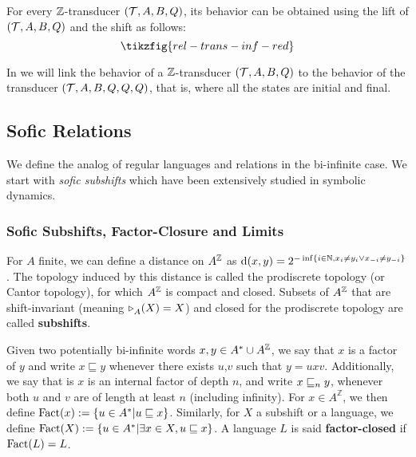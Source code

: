 \begin{proposition}\label{prop:zeta-transducer-red}
	For every ${\mathbb{Z}}$-transducer $({\mathcal{T}},A,B,Q)$, its behavior can be obtained using the lift of $({\mathcal{T}},A,B,Q)$ and the shift as follows:
	\[ \tikzfig{rel-trans-inf-red} \]
\end{proposition}

In  we will link the behavior of a ${\mathbb{Z}}$-transducer $({\mathcal{T}},A,B,Q)$ to the behavior of the transducer $({\mathcal{T}},A,B,Q,Q,Q)$, that is, where all the states are initial and final.

\subsection{Sofic Relations}
\label{sec:subshifts}

We define the analog of regular languages and relations in the bi-infinite case.
We start with \emph{sofic subshifts} which have been extensively studied in symbolic dynamics.

\subsubsection{Sofic Subshifts, Factor-Closure and Limits}
\label{subsec:sofic-subshfits}

For $A$ finite, we can define a distance on $A^{\mathbb{Z}}$ as 
$\mathrm{d}(x,y) = 2^{-\inf\{i \in  {\mathbb{N}}, x_i\neq y_i \vee x_{-i} \neq y_{-i}\}}$. The topology induced by this distance is called the prodiscrete topology (or Cantor topology), for which $A^{\mathbb{Z}}$ is compact and closed. Subsets of $A^{\mathbb{Z}}$ that are shift-invariant (meaning $\shift{}{}_A(X) = X$) and closed for the prodiscrete topology are called \textbf{subshifts}.

\begin{definition}[Factor] Given two potentially bi-infinite words $x,y \in A^* \cup A^{\mathbb{Z}}$, we say that $x$ is a factor of $y$ and write $x \sqsubseteq y$ whenever there exists $u$,$v$ such that $y = uxv$. Additionally, we say that is $x$ is an internal factor of depth $n$, and write $x \sqsubseteq_{n} y$, whenever both $u$ and $v$ are of length at least $n$ (including infinity).	
	For $x\in A^{\mathbb{Z}}$, we then define $\mathrm{Fact}(x):= \{ u \in A^* | u \sqsubseteq x\}$. Similarly, for $X$ a subshift or a language, we define  $\mathrm{Fact}(X):= \{ u \in A^* | \exists x \in X, u\sqsubseteq x\}$. A language $L$ is said \textbf{factor-closed} if $\mathrm{Fact}(L) = L$.
\end{definition}

